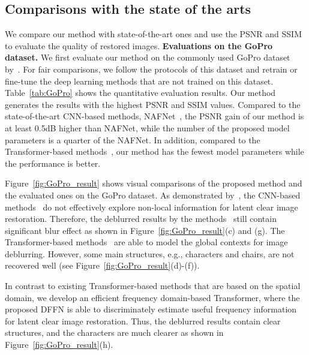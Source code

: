 \documentclass[10pt,twocolumn,letterpaper]{article}
\begin{document}
\subsection{Comparisons with the state of the arts}
We compare our method with state-of-the-art ones and use the PSNR and SSIM to evaluate the quality of restored images.
\vspace{-2mm}
{\flushleft \textbf{Evaluations on the GoPro dataset.}}
We first evaluate our method on the commonly used GoPro dataset by~\cite{GoPro}.
For fair comparisons, we follow the protocols of this dataset and retrain or fine-tune the deep learning methods that are not trained on this dataset.
Table~\ref{tab:GoPro} shows the quantitative evaluation results. Our method generates the results with the highest PSNR and SSIM values.
Compared to the state-of-the-art CNN-based methods, NAFNet~\cite{NAFNet}, the PSNR gain of our method is at least 0.5dB higher than NAFNet, while the number of the proposed model parameters is a quarter of the NAFNet.
In addition, compared to the Transformer-based methods~\cite{Restormer,Uformer,Stripformer}, our method has the fewest model parameters while the performance is better.



Figure~\ref{fig:GoPro_result} shows visual comparisons of the proposed method and the evaluated ones on the GoPro dataset.
As demonstrated by~\cite{Restormer}, the CNN-based methods~\cite{MIMO,NAFNet} do not effectively explore non-local information for latent clear image restoration. Therefore, the deblurred results by the methods~\cite{MIMO,NAFNet} still contain significant blur effect as shown in Figure~\ref{fig:GoPro_result}(c) and (g).
The Transformer-based methods~\cite{Restormer,Stripformer,TLC} are able to model the global contexts for image deblurring. However, some main structures, e.g., characters and chairs, are not recovered well (see Figure~\ref{fig:GoPro_result}(d)-(f)).

In contrast to existing Transformer-based methods that are based on the spatial domain, we develop an efficient frequency domain-based Transformer, where the proposed DFFN is able to discriminately estimate useful frequency information for latent clear image restoration. Thus, the deblurred results contain clear structures, and the characters are much clearer as shown in Figure~\ref{fig:GoPro_result}(h).
\end{document}
